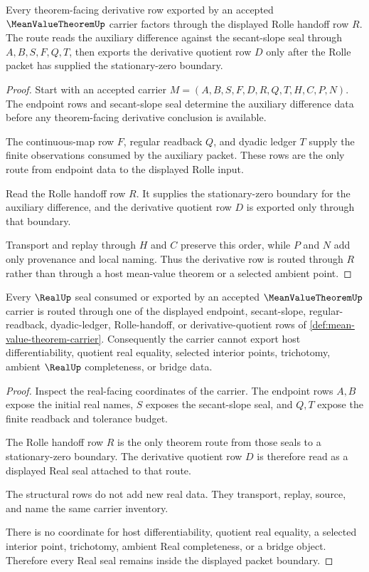 \begin{theorem}
\label{thm:mean-value-theorem-rolle-handoff}
Every theorem-facing derivative row exported by an accepted $\MeanValueTheoremUp$ carrier factors through the displayed Rolle handoff row $R$. The route reads the auxiliary difference against the secant-slope seal through $A,B,S,F,Q,T$, then exports the derivative quotient row $D$ only after the Rolle packet has supplied the stationary-zero boundary.
\end{theorem}
\begin{proof}
Start with an accepted carrier $M=(A,B,S,F,D,R,Q,T,H,C,P,N)$. The endpoint rows and secant-slope seal determine the auxiliary difference data before any theorem-facing derivative conclusion is available.

The continuous-map row $F$, regular readback $Q$, and dyadic ledger $T$ supply the finite observations consumed by the auxiliary packet. These rows are the only route from endpoint data to the displayed Rolle input.

Read the Rolle handoff row $R$. It supplies the stationary-zero boundary for the auxiliary difference, and the derivative quotient row $D$ is exported only through that boundary.

Transport and replay through $H$ and $C$ preserve this order, while $P$ and $N$ add only provenance and local naming. Thus the derivative row is routed through $R$ rather than through a host mean-value theorem or a selected ambient point.
\end{proof}

\begin{theorem}
\label{thm:mean-value-theorem-real-seal-boundary}
Every $\RealUp$ seal consumed or exported by an accepted $\MeanValueTheoremUp$ carrier is routed through one of the displayed endpoint, secant-slope, regular-readback, dyadic-ledger, Rolle-handoff, or derivative-quotient rows of \autoref{def:mean-value-theorem-carrier}. Consequently the carrier cannot export host differentiability, quotient real equality, selected interior points, trichotomy, ambient $\RealUp$ completeness, or bridge data.
\end{theorem}
\begin{proof}
Inspect the real-facing coordinates of the carrier. The endpoint rows $A,B$ expose the initial real names, $S$ exposes the secant-slope seal, and $Q,T$ expose the finite readback and tolerance budget.

The Rolle handoff row $R$ is the only theorem route from those seals to a stationary-zero boundary. The derivative quotient row $D$ is therefore read as a displayed Real seal attached to that route.

The structural rows do not add new real data. They transport, replay, source, and name the same carrier inventory.

There is no coordinate for host differentiability, quotient real equality, a selected interior point, trichotomy, ambient Real completeness, or a bridge object. Therefore every Real seal remains inside the displayed packet boundary.
\end{proof}

